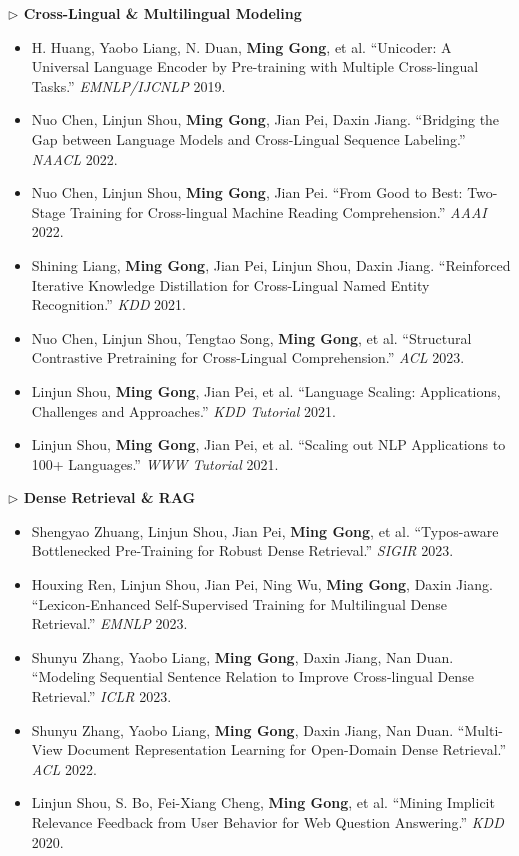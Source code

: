 \documentclass[10.5pt,letterpaper]{article}
\begin{document}
\noindent\textcolor{blue!60!black}{\textbf{$\triangleright$ Cross-Lingual \& Multilingual Modeling}}
\begin{itemize}
  \item H. Huang, Yaobo Liang, N. Duan, \textbf{Ming Gong}, et al. ``Unicoder: A Universal Language Encoder by Pre-training with Multiple Cross-lingual Tasks.'' \textit{EMNLP/IJCNLP} 2019.
  \item Nuo Chen, Linjun Shou, \textbf{Ming Gong}, Jian Pei, Daxin Jiang. ``Bridging the Gap between Language Models and Cross-Lingual Sequence Labeling.'' \textit{NAACL} 2022.
  \item Nuo Chen, Linjun Shou, \textbf{Ming Gong}, Jian Pei. ``From Good to Best: Two-Stage Training for Cross-lingual Machine Reading Comprehension.'' \textit{AAAI} 2022.
  \item Shining Liang, \textbf{Ming Gong}, Jian Pei, Linjun Shou, Daxin Jiang. ``Reinforced Iterative Knowledge Distillation for Cross-Lingual Named Entity Recognition.'' \textit{KDD} 2021.
  \item Nuo Chen, Linjun Shou, Tengtao Song, \textbf{Ming Gong}, et al. ``Structural Contrastive Pretraining for Cross-Lingual Comprehension.'' \textit{ACL} 2023.
  \item Linjun Shou, \textbf{Ming Gong}, Jian Pei, et al. ``Language Scaling: Applications, Challenges and Approaches.'' \textit{KDD Tutorial} 2021.
  \item Linjun Shou, \textbf{Ming Gong}, Jian Pei, et al. ``Scaling out NLP Applications to 100+ Languages.'' \textit{WWW Tutorial} 2021.
\end{itemize}

\noindent\textcolor{blue!60!black}{\textbf{$\triangleright$ Dense Retrieval \& RAG}}
\begin{itemize}
  \item Shengyao Zhuang, Linjun Shou, Jian Pei, \textbf{Ming Gong}, et al. ``Typos-aware Bottlenecked Pre-Training for Robust Dense Retrieval.'' \textit{SIGIR} 2023.
  \item Houxing Ren, Linjun Shou, Jian Pei, Ning Wu, \textbf{Ming Gong}, Daxin Jiang. ``Lexicon-Enhanced Self-Supervised Training for Multilingual Dense Retrieval.'' \textit{EMNLP} 2023.
  \item Shunyu Zhang, Yaobo Liang, \textbf{Ming Gong}, Daxin Jiang, Nan Duan. ``Modeling Sequential Sentence Relation to Improve Cross-lingual Dense Retrieval.'' \textit{ICLR} 2023.
  \item Shunyu Zhang, Yaobo Liang, \textbf{Ming Gong}, Daxin Jiang, Nan Duan. ``Multi-View Document Representation Learning for Open-Domain Dense Retrieval.'' \textit{ACL} 2022.
  \item Linjun Shou, S. Bo, Fei-Xiang Cheng, \textbf{Ming Gong}, et al. ``Mining Implicit Relevance Feedback from User Behavior for Web Question Answering.'' \textit{KDD} 2020.
\end{itemize}
\end{document}
